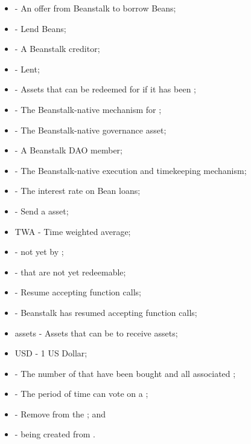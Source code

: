 \documentclass[class=article, crop=false]{standalone}
\begin{document}
\begin{itemize}[topsep=0pt, itemsep=3pt,leftmargin=16pt]
    \item[]  - \hypertarget{ht178}{An offer from Beanstalk to borrow Beans};
    \item[]  - \hypertarget{ht179}{Lend Beans};
    \item[]  - \hypertarget{ht180}{A Beanstalk creditor};
    \item[]  - \hypertarget{ht181}{Lent};
    \item[]  - \hypertarget{ht182}{Assets that can be redeemed for  if it has been };
    \item[]  - \hypertarget{ht183}{The Beanstalk-native mechanism for };
    \item[]  - \hypertarget{ht184}{The Beanstalk-native governance asset};
    \item[]  - \hypertarget{ht185}{A Beanstalk DAO member};
    \item[]  - \hypertarget{ht186}{The Beanstalk-native execution and timekeeping mechanism};
    \item[]  - \hypertarget{ht205}{The interest rate on Bean loans};
    \item[]  - \hypertarget{ht206}{Send a  asset};
    \item[] TWA - Time weighted average;
    \item[]  - \hypertarget{ht210}{ not yet  by };
    \item[]  - \hypertarget{ht211}{ that are not yet redeemable};
    \item[]  - \hypertarget{ht212}{Resume accepting  function calls};
    \item[]  - \hypertarget{ht213}{Beanstalk has resumed accepting  function calls};
    \item[]  assets - \hypertarget{ht214}{Assets that can be  to receive  assets};
    \item[] USD - 1 US Dollar;
    \item[]  - \hypertarget{ht215}{The number of  that have been bought and  all associated };
    \item[]  - \hypertarget{ht219}{The period of time  can vote on a };
    \item[]  - \hypertarget{ht220}{Remove from the }; and
    \item[]  - \hypertarget{ht228}{ being created from  \Bean}.
\end{itemize}
\end{document}
